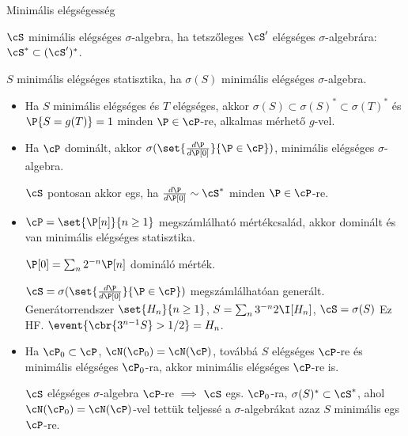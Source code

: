 \documentclass[aspectratio=169,notheorems,9pt,\option]{beamer}
\begin{document}
\begin{frame}{Minimális elégségesség}
  \begin{df}
    $\cS$ minimális elégséges $\sigma$-algebra, ha tetszőleges  
    $\cS'$ elégséges $\sigma$-algebrára: $\cS^*\subset (\cS')^*$.

    $S$ minimális elégséges statisztika, ha $\sigma(S)$ minimális elégséges $\sigma$-algebra.
  \end{df}
  \continue
  \begin{itemize}
    \item Ha $S$ minimális elégséges és $T$ elégséges, akkor $\sigma(S)\subset\sigma(S)^*\subset \sigma(T)^*$ 
    és $\P{S=g(T)}=1$ minden $\P\in\cP$-re, alkalmas mérhető $g$-vel.
    \item Ha $\cP$ dominált, akkor $\sigma(\set{\frac{d\P}{d\P[0]}}{\P\in\cP})$,
    minimális elégséges $\sigma$-algebra.
    \pause

    $\cS$ pontosan akkor egs, ha $\frac{d\P}{d\P[0]}\sim\cS^*$ minden $\P\in\cP$-re. 

    \item $\cP=\set{\P[n]}{n\geq1}$ megszámlálható mértékcsalád, akkor 
    dominált és van minimális elégséges statisztika.
    \pause

    $\P[0]=\sum_n 2^{-n}\P[n]$ domináló mérték.

    $\cS=\sigma(\set{\frac{d\P}{d\P[0]}}{\P\in\cP})$ megszámlálhatóan generált. 
    Generátorrendszer $\set{H_n}{n\geq1}$, $S=\sum_n 3^{-n} 2\I[H_n]$, $\cS=\sigma(S)$ 
    Ez HF. $\event{\cbr{3^{n-1} S}>1/2}=H_n$.

    \item Ha $\cP_0\subset\cP$, $\cN(\cP_0)=\cN(\cP)$, 
    továbbá $S$ elégséges $\cP$-re és minimális elégséges $\cP_0$-ra, akkor 
    minimális elégséges $\cP$-re is.
    \pause

    $\cS$ elégséges $\sigma$-algebra $\cP$-re $\implies$ $\cS$ egs. 
    $\cP_0$-ra, $\sigma(S)^*\subset \cS^*$,
    ahol $\cN(\cP_0)=\cN(\cP)$-vel tettük teljessé a 
    $\sigma$-algebrákat azaz $S$ minimális egs $\cP$-re.
  \end{itemize}
\end{frame}
\end{document}
